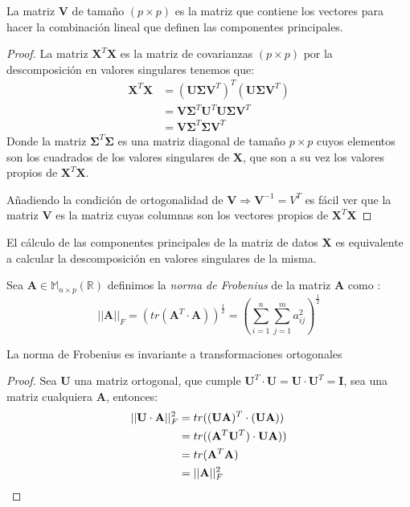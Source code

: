 \begin{propo}
La matriz \textbf{V} de tamaño $(p\times p)$ es la matriz que contiene los vectores para hacer la combinación lineal que definen las componentes principales.
\begin{proof}
La matriz $\textbf{X}^T \textbf{X}$ es la matriz de covarianzas $(p \times p)$  por la descomposición en valores singulares tenemos que:
\begin{align*}
\textbf{X}^T \textbf{X} &= (\textbf{U}\mathbf{\Sigma} \textbf{V}^T)^T (\textbf{U}\mathbf{\Sigma} \textbf{V}^T)\\
&= \textbf{V}\mathbf{\Sigma} ^T \textbf{U}^T \textbf{U}\mathbf{\Sigma} \textbf{V}^T\\
&= \textbf{V}\mathbf{\Sigma} ^T \mathbf{\Sigma} \textbf{V}^T
\end{align*}
Donde la matriz $\mathbf{\Sigma} ^T \mathbf{\Sigma} $ es una matriz diagonal de tamaño $p \times p $ cuyos elementos son los cuadrados de los valores singulares de \textbf{X}, que son a su vez los valores propios de $\textbf{X}^T \textbf{X}$. 

\noindent Añadiendo la condición de ortogonalidad de $\textbf{V}\Rightarrow \textbf{V}^{-1}=V^T$ es fácil ver que la matriz \textbf{V} es la matriz cuyas columnas son los vectores propios de $\textbf{X}^T\textbf{X}$
\end{proof}
\end{propo}

\begin{coro}
El cálculo de las componentes principales de la matriz de datos \textbf{X} es equivalente a calcular la descomposición en valores singulares de la misma. 
\end {coro}

\begin{defi}
Sea $\textbf{A}\in \mathbb{M}_{n\times p}(\mathbb{R})$ definimos la \textit{norma de Frobenius} de la matriz \textbf{A} como :
\begin{equation}
||\textbf{A}||_F=(tr(\textbf{A}^T\cdot \textbf{A}))^{\frac{1}{2}}=\left(\sum_{i=1}^{n}\sum _{j=1}^{m}a_{ij}^2\right)^{\frac{1}{2}}
\end{equation}
\end{defi}

\begin{propo}
La norma de Frobenius es invariante a transformaciones ortogonales
\begin{proof}
Sea $\mathbf{U}$ una matriz ortogonal, que cumple $\mathbf{U}^T\cdot \mathbf{U}=\mathbf{U}\cdot \mathbf{U}^T=\textbf{I}$, sea una matriz cualquiera $\mathbf{A}$, entonces:
\begin{align*}
||\mathbf{U} \cdot \mathbf{A}||_F^2&=tr((\mathbf{U} \mathbf{A})^T\cdot(\mathbf{U} \mathbf{A}))\\
&=tr((\mathbf{A}^T \mathbf{U}^T)\cdot \mathbf{U} \mathbf{A}))\\
&=tr(\mathbf{A}^T \mathbf{A})\\
&=||\mathbf{A}||_F^2\qedhere
\end{align*}
\end{proof}
\end{propo}

